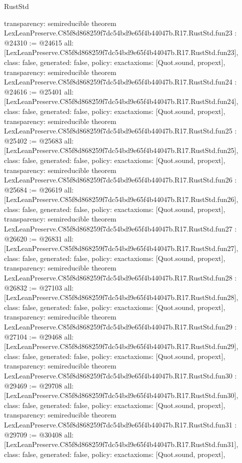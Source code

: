 \begin{lexlean}{RustStd}
\begin{coremodule}
{  transparency: semireducible
}
theorem LexLeanPreserve.C85f8d868259f7dc54bd9e65f4b44047b.R17.RustStd.fun23 : @24310 := @24615 {
  all: [LexLeanPreserve.C85f8d868259f7dc54bd9e65f4b44047b.R17.RustStd.fun23],
  class: false,
  generated: false,
  policy: exact{axioms: [Quot.sound, propext]},
  transparency: semireducible
}
theorem LexLeanPreserve.C85f8d868259f7dc54bd9e65f4b44047b.R17.RustStd.fun24 : @24616 := @25401 {
  all: [LexLeanPreserve.C85f8d868259f7dc54bd9e65f4b44047b.R17.RustStd.fun24],
  class: false,
  generated: false,
  policy: exact{axioms: [Quot.sound, propext]},
  transparency: semireducible
}
theorem LexLeanPreserve.C85f8d868259f7dc54bd9e65f4b44047b.R17.RustStd.fun25 : @25402 := @25683 {
  all: [LexLeanPreserve.C85f8d868259f7dc54bd9e65f4b44047b.R17.RustStd.fun25],
  class: false,
  generated: false,
  policy: exact{axioms: [Quot.sound, propext]},
  transparency: semireducible
}
theorem LexLeanPreserve.C85f8d868259f7dc54bd9e65f4b44047b.R17.RustStd.fun26 : @25684 := @26619 {
  all: [LexLeanPreserve.C85f8d868259f7dc54bd9e65f4b44047b.R17.RustStd.fun26],
  class: false,
  generated: false,
  policy: exact{axioms: [Quot.sound, propext]},
  transparency: semireducible
}
theorem LexLeanPreserve.C85f8d868259f7dc54bd9e65f4b44047b.R17.RustStd.fun27 : @26620 := @26831 {
  all: [LexLeanPreserve.C85f8d868259f7dc54bd9e65f4b44047b.R17.RustStd.fun27],
  class: false,
  generated: false,
  policy: exact{axioms: [Quot.sound, propext]},
  transparency: semireducible
}
theorem LexLeanPreserve.C85f8d868259f7dc54bd9e65f4b44047b.R17.RustStd.fun28 : @26832 := @27103 {
  all: [LexLeanPreserve.C85f8d868259f7dc54bd9e65f4b44047b.R17.RustStd.fun28],
  class: false,
  generated: false,
  policy: exact{axioms: [Quot.sound, propext]},
  transparency: semireducible
}
theorem LexLeanPreserve.C85f8d868259f7dc54bd9e65f4b44047b.R17.RustStd.fun29 : @27104 := @29468 {
  all: [LexLeanPreserve.C85f8d868259f7dc54bd9e65f4b44047b.R17.RustStd.fun29],
  class: false,
  generated: false,
  policy: exact{axioms: [Quot.sound, propext]},
  transparency: semireducible
}
theorem LexLeanPreserve.C85f8d868259f7dc54bd9e65f4b44047b.R17.RustStd.fun30 : @29469 := @29708 {
  all: [LexLeanPreserve.C85f8d868259f7dc54bd9e65f4b44047b.R17.RustStd.fun30],
  class: false,
  generated: false,
  policy: exact{axioms: [Quot.sound, propext]},
  transparency: semireducible
}
theorem LexLeanPreserve.C85f8d868259f7dc54bd9e65f4b44047b.R17.RustStd.fun31 : @29709 := @30408 {
  all: [LexLeanPreserve.C85f8d868259f7dc54bd9e65f4b44047b.R17.RustStd.fun31],
  class: false,
  generated: false,
  policy: exact{axioms: [Quot.sound, propext]},
}
\end{coremodule}
\end{lexlean}
